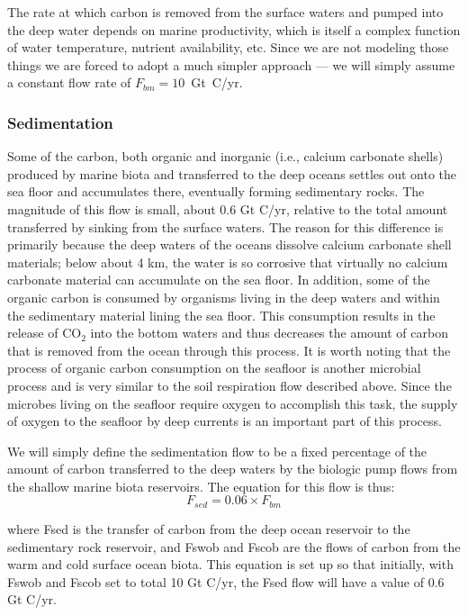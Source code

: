\documentclass[11pt,letterpaper]{article}
\begin{document}
The rate at which carbon is removed from the surface waters and pumped into the deep water depends on marine productivity, which is itself a complex function of water temperature, nutrient availability, etc. Since we are not modeling those things we are forced to adopt a much simpler approach --- we will simply assume a constant flow rate of $F_{bm}=10$~Gt~C/yr.


\subsubsection*{Sedimentation}
Some of the carbon, both organic and inorganic (i.e., calcium carbonate shells) produced by marine biota and transferred to the deep oceans settles out onto the sea floor and accumulates there, eventually forming sedimentary rocks. The magnitude of this flow is small, about 0.6 Gt C/yr, relative to the total amount transferred by sinking from the surface waters. The reason for this difference is primarily because the deep waters of the oceans dissolve calcium carbonate shell materials; below about 4 km, the water is so corrosive that virtually no calcium carbonate material can accumulate on the sea floor. In addition, some of the organic carbon is consumed by organisms living in the deep waters and within the sedimentary material lining the sea floor. This consumption results in the release of CO$_2$ into the bottom waters and thus decreases the amount of carbon that is removed from the ocean through this process. It is worth noting that the process of organic carbon consumption on the seafloor is another microbial process and is very similar to the soil respiration flow described above. Since the microbes living on the seafloor require oxygen to accomplish this task, the supply of oxygen to the seafloor by deep currents is an important part of this process.

We will simply define the sedimentation flow to be a fixed percentage of the amount of carbon transferred to the deep waters by the biologic pump flows from the shallow marine biota reservoirs. The equation for this flow is thus:
\begin{equation}
F_{sed} = 0.06\times F_{bm}
\end{equation}

where Fsed is the transfer of carbon from the deep ocean reservoir to the sedimentary rock reservoir, and Fswob and Fscob are the flows of carbon from the warm and cold surface ocean biota. This equation is set up so that initially, with Fswob and Fscob set to total 10 Gt C/yr, the Fsed flow will have a value of 0.6 Gt C/yr.
\end{document}
